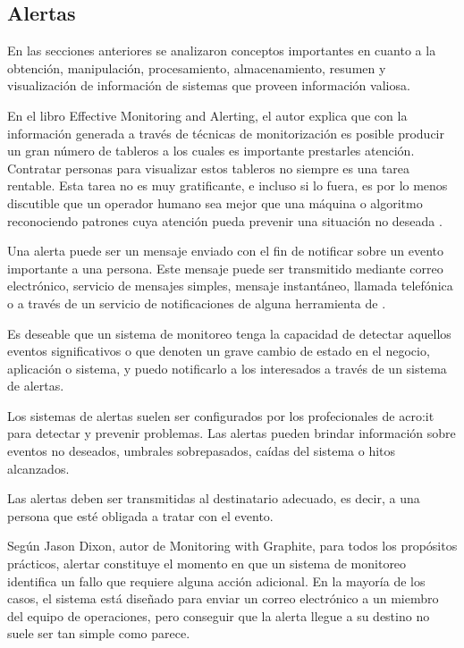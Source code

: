 \subsection{Alertas}
\label{alertas}

En las secciones anteriores se analizaron conceptos importantes en cuanto a
la obtención, manipulación, procesamiento, almacenamiento, resumen y
visualización de información de sistemas que proveen información valiosa.

En el libro Effective Monitoring and Alerting, el autor explica que con la
información generada a través de técnicas de monitorización es posible producir
un gran número de tableros a los cuales es importante prestarles atención.
Contratar personas para visualizar estos tableros no siempre es una tarea
rentable. Esta tarea no es muy gratificante, e incluso si lo fuera, es por lo
menos discutible que un operador humano sea mejor que una máquina o algoritmo
reconociendo patrones cuya atención pueda prevenir una situación no deseada
\cite[p. ~ 47]{monitoreo:efective_monitoring_and_alerting}.

Una alerta puede ser un mensaje enviado con el fin de notificar sobre un evento
importante a una persona. Este mensaje puede ser transmitido mediante correo
electrónico, servicio de mensajes simples, mensaje instantáneo, llamada
telefónica o a través de un servicio de notificaciones de alguna herramienta de
.

Es deseable que un sistema de monitoreo tenga la capacidad de detectar aquellos
eventos significativos o que denoten un grave cambio de estado en el negocio,
aplicación o sistema, y puedo notificarlo a los interesados a través de un
sistema de alertas.

Los sistemas de alertas suelen ser configurados por los profecionales de
\gls{acro:it} para detectar y prevenir problemas. Las alertas pueden brindar
información sobre eventos no deseados, umbrales sobrepasados, caídas del
sistema o hitos alcanzados.

Las alertas deben ser transmitidas al destinatario adecuado, es decir, a una
persona que esté obligada a tratar con el evento.

Según Jason Dixon, autor de Monitoring with Graphite, para todos los propósitos
prácticos, alertar constituye el momento en que un sistema de monitoreo
identifica un fallo que requiere alguna acción adicional. En la mayoría de los
casos, el sistema está diseñado para enviar un correo electrónico a un miembro
del equipo de operaciones, pero conseguir que la alerta llegue a su destino no
suele ser tan simple como parece.

